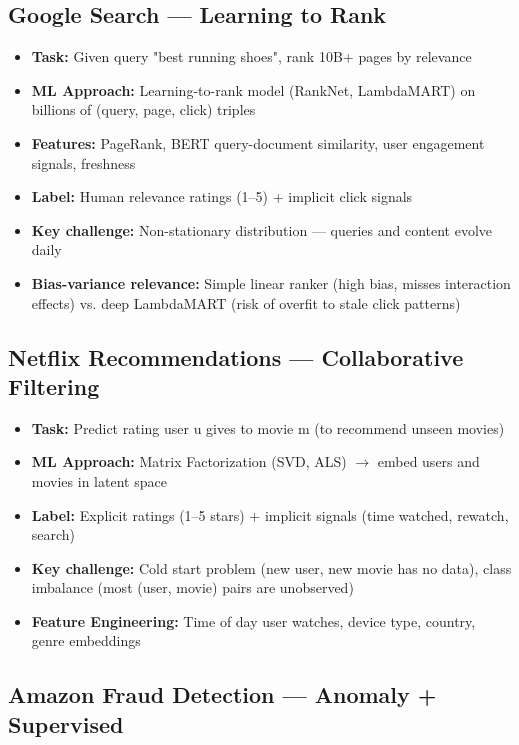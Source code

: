 \documentclass[11pt]{article}
\providecommand{\tightlist}{\setlength{\itemsep}{1pt}\setlength{\parskip}{0pt}}
\begin{document}
\subsection{Google Search --- Learning to Rank}\label{google-search--learning-to-rank}

\begin{itemize}
\tightlist
\item
  \textbf{Task:} Given query "best running shoes", rank 10B+ pages by relevance
\item
  \textbf{ML Approach:} Learning-to-rank model (RankNet, LambdaMART) on billions of (query, page, click) triples
\item
  \textbf{Features:} PageRank, BERT query-document similarity, user engagement signals, freshness
\item
  \textbf{Label:} Human relevance ratings (1--5) + implicit click signals
\item
  \textbf{Key challenge:} Non-stationary distribution --- queries and content evolve daily
\item
  \textbf{Bias-variance relevance:} Simple linear ranker (high bias, misses interaction effects) vs. deep LambdaMART (risk of overfit to stale click patterns)
\end{itemize}

\subsection{Netflix Recommendations --- Collaborative Filtering}\label{netflix-recommendations--collaborative-filtering}

\begin{itemize}
\tightlist
\item
  \textbf{Task:} Predict rating user u gives to movie m (to recommend unseen movies)
\item
  \textbf{ML Approach:} Matrix Factorization (SVD, ALS) \(\rightarrow\) embed users and movies in latent space
\item
  \textbf{Label:} Explicit ratings (1--5 stars) + implicit signals (time watched, rewatch, search)
\item
  \textbf{Key challenge:} Cold start problem (new user, new movie has no data), class imbalance (most (user, movie) pairs are unobserved)
\item
  \textbf{Feature Engineering:} Time of day user watches, device type, country, genre embeddings
\end{itemize}

\subsection{Amazon Fraud Detection --- Anomaly + Supervised}\label{amazon-fraud-detection--anomaly--supervised}
\end{document}
